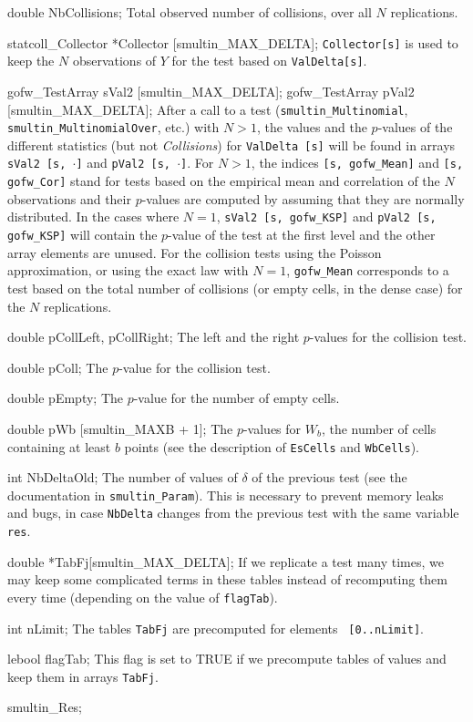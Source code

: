 {   double NbCollisions;
\endcode
\tabb
  Total observed number of collisions, over all $N$ replications.
 \endtabb
\code

   statcoll_Collector *Collector [smultin_MAX_DELTA];
\endcode
\tabb
  {\tt Collector[s]} is used to keep the $N$ observations of $Y$ 
  for the test based on {\tt ValDelta[s]}.
\endtabb
\code

   gofw_TestArray sVal2 [smultin_MAX_DELTA];
   gofw_TestArray pVal2 [smultin_MAX_DELTA];
\endcode
 \tabb
  After a call to a test ({\tt smultin\_Multinomial},
  {\tt smultin\_MultinomialOver}, etc.) with $N > 1$,
  the values and the $p$-values of the different statistics (but not
  {\em Collisions\/}) for {\tt ValDelta [s]} will be found in arrays
  {\tt sVal2 [s, $\cdot$]} and {\tt pVal2 [s, $\cdot$]}.
  For $N > 1$, the indices {\tt [s, gofw\_Mean]} and {\tt [s, gofw\_Cor]} 
  stand for tests based on the empirical mean and correlation
  of the $N$ observations and their $p$-values are computed by assuming
  that they are normally distributed.
  In the cases where $N=1$, {\tt sVal2 [s, gofw\_KSP]} and
  {\tt pVal2 [s, gofw\_KSP]} will contain
  the $p$-value of the test at the first level  and the
  other array elements are unused. 
  For the collision tests using the Poisson approximation,
  or using the exact law with $N = 1$,
  {\tt gofw\_Mean} corresponds to a  test based on the total number of
  collisions (or empty cells, in the dense case)
  for the $N$ replications.
 \endtabb
\code

   double pCollLeft, pCollRight;
\endcode
 \tabb The left and the right $p$-values for the collision test.
 \endtabb
\code

   double pColl;
\endcode
 \tabb The $p$-value for the collision test.
 \endtabb
\code

   double pEmpty;
\endcode
\tabb
  The $p$-value for the number of empty cells.
\endtabb
\code

   double pWb [smultin_MAXB + 1];
\endcode
 \tabb 
 The  $p$-values for $W_b$, the number of cells containing at 
  least $b$ points (see the description of {\tt EsCells} and
  {\tt  WbCells}).
 \endtabb
\fi  %
\hide  %
\code

   int NbDeltaOld;
\endcode
\tabb
   The number of values of $\delta$ of the previous test (see the
   documentation in {\tt smultin\_Param}). This is necessary to prevent
   memory leaks and bugs, in case {\tt NbDelta} changes from the previous
   test with the same variable {\tt res}.
\endtabb
\code

   double *TabFj[smultin_MAX_DELTA];
\endcode
\tabb If we replicate a test many times, we may keep some complicated 
  terms in these tables instead of recomputing them every time
  (depending on the value of {\tt flagTab}).
\endtabb
\code

   int nLimit;
\endcode
\tabb  The tables {\tt TabFj} are precomputed for elements {\tt
  [0..nLimit]}.
\endtabb
\code

   lebool flagTab;
\endcode
\tabb This flag is set to TRUE if we precompute tables of values and keep
   them in arrays {\tt TabFj}. 
\endtabb
\endhide  %
\ifdetailed  %
\code

} smultin_Res;



